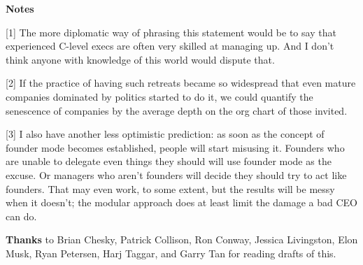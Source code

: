 \textbf{Notes}

[1] The more diplomatic way of phrasing this statement would be
                  to say that experienced C-level execs are often very skilled
                  at managing up. And I don't think anyone with knowledge of
                  this world would dispute that.

[2] If the practice of having such retreats became so
                  widespread that even mature companies dominated by politics
                  started to do it, we could quantify the senescence of
                  companies by the average depth on the org chart of those
                  invited.

[3] I also have another less optimistic prediction: as soon as
                  the concept of founder mode becomes established, people will
                  start misusing it. Founders who are unable to delegate even
                  things they should will use founder mode as the excuse. Or
                  managers who aren't founders will decide they should try to
                  act like founders. That may even work, to some extent, but the
                  results will be messy when it doesn't; the modular approach
                  does at least limit the damage a bad CEO can do.



\textbf{Thanks} to Brian Chesky, Patrick Collison, Ron
                    Conway, Jessica Livingston, Elon Musk, Ryan Petersen, Harj
                    Taggar, and Garry Tan for reading drafts of this.


              
            
          
          
            
              
                


                  
              
            
          
        
